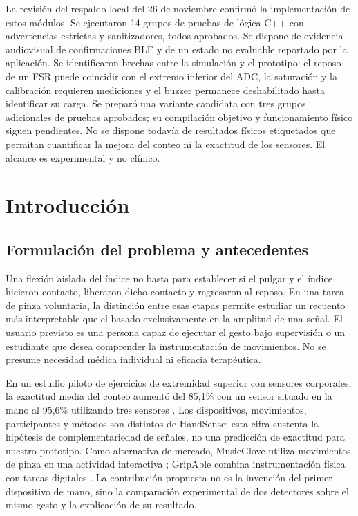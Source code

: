 \documentclass[11pt,letterpaper]{article}
\begin{document}
La revisión del respaldo local del 26 de noviembre confirmó la implementación de estos módulos. Se ejecutaron 14 grupos de pruebas de lógica C++ con advertencias estrictas y sanitizadores, todos aprobados. Se dispone de evidencia audiovisual de confirmaciones BLE y de un estado no evaluable reportado por la aplicación. Se identificaron brechas entre la simulación y el prototipo: el reposo de un FSR puede coincidir con el extremo inferior del ADC, la saturación y la calibración requieren mediciones y el buzzer permanece deshabilitado hasta identificar su carga. Se preparó una variante candidata con tres grupos adicionales de pruebas aprobados; su compilación objetivo y funcionamiento físico siguen pendientes. No se dispone todavía de resultados físicos etiquetados que permitan cuantificar la mejora del conteo ni la exactitud de los sensores. El alcance es experimental y no clínico.
\clearpage
\section{Introducción}
\subsection{Formulación del problema y antecedentes}
Una flexión aislada del índice no basta para establecer si el pulgar y el índice hicieron contacto, liberaron dicho contacto y regresaron al reposo. En una tarea de pinza voluntaria, la distinción entre esas etapas permite estudiar un recuento más interpretable que el basado exclusivamente en la amplitud de una señal. El usuario previsto es una persona capaz de ejecutar el gesto bajo supervisión o un estudiante que desea comprender la instrumentación de movimientos. No se presume necesidad médica individual ni eficacia terapéutica.

En un estudio piloto de ejercicios de extremidad superior con sensores corporales, la exactitud media del conteo aumentó del 85,1\% con un sensor situado en la mano al 95,6\% utilizando tres sensores \cite{pilot}. Los dispositivos, movimientos, participantes y métodos son distintos de HandSense: esta cifra sustenta la hipótesis de complementariedad de señales, no una predicción de exactitud para nuestro prototipo. Como alternativa de mercado, MusicGlove utiliza movimientos de pinza en una actividad interactiva \cite{musicglove}; GripAble combina instrumentación física con tareas digitales \cite{gripable}. La contribución propuesta no es la invención del primer dispositivo de mano, sino la comparación experimental de dos detectores sobre el mismo gesto y la explicación de su resultado.
\end{document}
